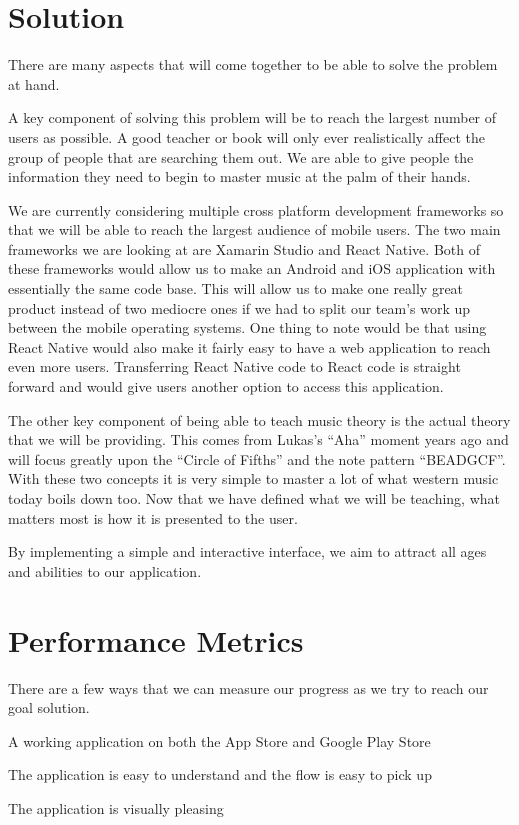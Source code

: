 \documentclass[10pt,letterpaper,draftclsnofoot,onecolumn]{IEEEtran}
\begin{document}
\section{Solution}
\noindent There are many aspects that will come together to be able to solve the problem at hand.

A key component of solving this problem will be to reach the largest number of users as possible. A good teacher or book will only ever realistically affect the group of people that are searching them out. We are able to give people the information they need to begin to master music at the palm of their hands. 

We are currently considering multiple cross platform development frameworks so that we will be able to reach the largest audience of mobile users. The two main frameworks we are looking at are Xamarin Studio and React Native. Both of these frameworks would allow us to make an Android and iOS application with essentially the same code base. This will allow us to make one really great product instead of two mediocre ones if we had to split our team's work up between the mobile operating systems. One thing to note would be that using React Native would also make it fairly easy to have a web application to reach even more users. Transferring React Native code to React code is straight forward and would give users another option to access this application.

The other key component of being able to teach music theory is the actual theory that we will be providing. This comes from Lukas’s “Aha” moment years ago and will focus greatly upon the “Circle of Fifths” and the note pattern “BEADGCF”. With these two concepts it is very simple to master a lot of what western music today boils down too. Now that we have defined what we will be teaching, what matters most is how it is presented to the user.

By implementing a simple and interactive interface, we aim to attract all ages and abilities to our application.

\section{Performance Metrics}
\noindent There are a few ways that we can measure our progress as we try to reach our goal solution.

A working application on both the App Store and Google Play Store

The application is easy to understand and the flow is easy to pick up

The application is visually pleasing
\end{document}
